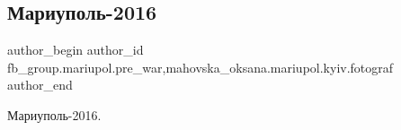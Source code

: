  
 
 
 
 

\subsection{Мариуполь-2016}
\label{sec:11_03_2023.fb.fb_group.mariupol.pre_war.1.mariupol_2016}
 
\ifcmt
 author_begin
   author_id fb_group.mariupol.pre_war,mahovska_oksana.mariupol.kyiv.fotograf
 author_end
\fi

Мариуполь-2016.
